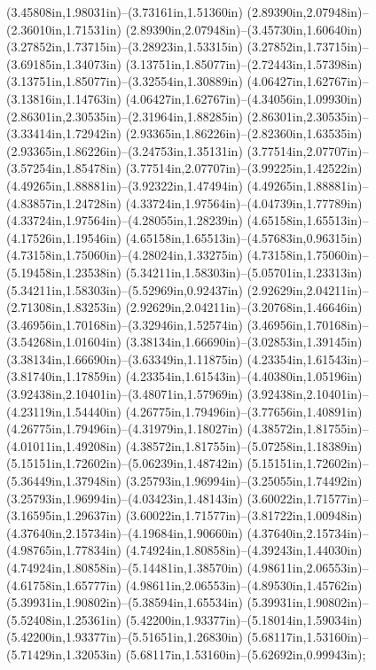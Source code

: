 (3.45808in,1.98031in)--(3.73161in,1.51360in) (2.89390in,2.07948in)--(2.36010in,1.71531in) (2.89390in,2.07948in)--(3.45730in,1.60640in) (3.27852in,1.73715in)--(3.28923in,1.53315in) (3.27852in,1.73715in)--(3.69185in,1.34073in) (3.13751in,1.85077in)--(2.72443in,1.57398in) (3.13751in,1.85077in)--(3.32554in,1.30889in) (4.06427in,1.62767in)--(3.13816in,1.14763in) (4.06427in,1.62767in)--(4.34056in,1.09930in) (2.86301in,2.30535in)--(2.31964in,1.88285in) (2.86301in,2.30535in)--(3.33414in,1.72942in) (2.93365in,1.86226in)--(2.82360in,1.63535in) (2.93365in,1.86226in)--(3.24753in,1.35131in) (3.77514in,2.07707in)--(3.57254in,1.85478in) (3.77514in,2.07707in)--(3.99225in,1.42522in) (4.49265in,1.88881in)--(3.92322in,1.47494in) (4.49265in,1.88881in)--(4.83857in,1.24728in) (4.33724in,1.97564in)--(4.04739in,1.77789in) (4.33724in,1.97564in)--(4.28055in,1.28239in) (4.65158in,1.65513in)--(4.17526in,1.19546in) (4.65158in,1.65513in)--(4.57683in,0.96315in) (4.73158in,1.75060in)--(4.28024in,1.33275in) (4.73158in,1.75060in)--(5.19458in,1.23538in) (5.34211in,1.58303in)--(5.05701in,1.23313in) (5.34211in,1.58303in)--(5.52969in,0.92437in) (2.92629in,2.04211in)--(2.71308in,1.83253in) (2.92629in,2.04211in)--(3.20768in,1.46646in) (3.46956in,1.70168in)--(3.32946in,1.52574in) (3.46956in,1.70168in)--(3.54268in,1.01604in) (3.38134in,1.66690in)--(3.02853in,1.39145in) (3.38134in,1.66690in)--(3.63349in,1.11875in) (4.23354in,1.61543in)--(3.81740in,1.17859in) (4.23354in,1.61543in)--(4.40380in,1.05196in) (3.92438in,2.10401in)--(3.48071in,1.57969in) (3.92438in,2.10401in)--(4.23119in,1.54440in) (4.26775in,1.79496in)--(3.77656in,1.40891in) (4.26775in,1.79496in)--(4.31979in,1.18027in) (4.38572in,1.81755in)--(4.01011in,1.49208in) (4.38572in,1.81755in)--(5.07258in,1.18389in) (5.15151in,1.72602in)--(5.06239in,1.48742in) (5.15151in,1.72602in)--(5.36449in,1.37948in) (3.25793in,1.96994in)--(3.25055in,1.74492in) (3.25793in,1.96994in)--(4.03423in,1.48143in) (3.60022in,1.71577in)--(3.16595in,1.29637in) (3.60022in,1.71577in)--(3.81722in,1.00948in) (4.37640in,2.15734in)--(4.19684in,1.90660in) (4.37640in,2.15734in)--(4.98765in,1.77834in) (4.74924in,1.80858in)--(4.39243in,1.44030in) (4.74924in,1.80858in)--(5.14481in,1.38570in) (4.98611in,2.06553in)--(4.61758in,1.65777in) (4.98611in,2.06553in)--(4.89530in,1.45762in) (5.39931in,1.90802in)--(5.38594in,1.65534in) (5.39931in,1.90802in)--(5.52408in,1.25361in) (5.42200in,1.93377in)--(5.18014in,1.59034in) (5.42200in,1.93377in)--(5.51651in,1.26830in) (5.68117in,1.53160in)--(5.71429in,1.32053in) (5.68117in,1.53160in)--(5.62692in,0.99943in);
